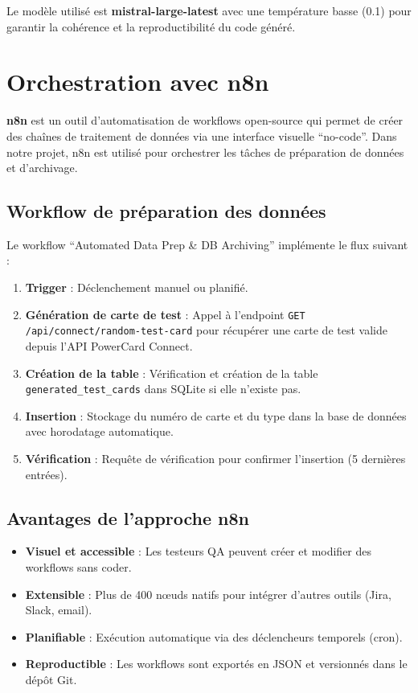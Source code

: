 Le modèle utilisé est \textbf{mistral-large-latest} avec une température basse (0.1) pour garantir la cohérence et la reproductibilité du code généré.

\section{Orchestration avec n8n}

\textbf{n8n} est un outil d'automatisation de workflows open-source qui permet de créer des chaînes de traitement de données via une interface visuelle ``no-code''. Dans notre projet, n8n est utilisé pour orchestrer les tâches de préparation de données et d'archivage.

\subsection{Workflow de préparation des données}

Le workflow ``Automated Data Prep \& DB Archiving'' implémente le flux suivant :

\begin{enumerate}
\item \textbf{Trigger} : Déclenchement manuel ou planifié.
\item \textbf{Génération de carte de test} : Appel à l'endpoint \texttt{GET /api/connect/random-test-card} pour récupérer une carte de test valide depuis l'API PowerCard Connect.
\item \textbf{Création de la table} : Vérification et création de la table \texttt{generated\_test\_cards} dans SQLite si elle n'existe pas.
\item \textbf{Insertion} : Stockage du numéro de carte et du type dans la base de données avec horodatage automatique.
\item \textbf{Vérification} : Requête de vérification pour confirmer l'insertion (5 dernières entrées).
\end{enumerate}

\subsection{Avantages de l'approche n8n}

\begin{itemize}[leftmargin=*]
\item \textbf{Visuel et accessible} : Les testeurs QA peuvent créer et modifier des workflows sans coder.
\item \textbf{Extensible} : Plus de 400 n\oe{}uds natifs pour intégrer d'autres outils (Jira, Slack, email).
\item \textbf{Planifiable} : Exécution automatique via des déclencheurs temporels (cron).
\item \textbf{Reproductible} : Les workflows sont exportés en JSON et versionnés dans le dépôt Git.
\end{itemize}


